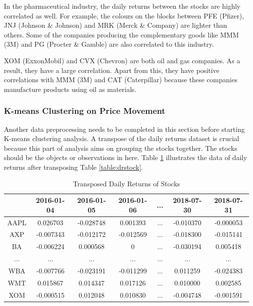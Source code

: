 \documentclass[11pt]{article} %
\theoremstyle{plain}
\theoremstyle{definition}
\begin{document}
In the pharmaceutical industry, the daily returns between the stocks are highly correlated as well. For example, the colours on the blocks between PFE (Pfizer), JNJ (Johnson \& Johnson) and MRK (Merck \& Company) are lighter than others. Some of the companies producing the complementary goods like MMM (3M) and PG (Procter \& Gamble) are also correlated to this industry.

XOM (ExxonMobil) and CVX (Chevron) are both oil and gas companies. As a result, they have a large correlation. Apart from this, they have positive correlations with MMM (3M) and CAT (Caterpillar) because these companies manufacture products using oil as materials.

\subsubsection{K-means Clustering on Price Movement}

Another data preprocessing needs to be completed in this section before starting K-means clustering analysis. A transpose of the daily returns dataset is crucial because this part of analysis aims on grouping the stocks together. The stocks should be the objects or observations in here. Table \ref{table:tpstock} illustrates the data of daily returns after transposing Table \ref{table:drstock}.

{
  \begin{table}[ht]
    \centering
    \scriptsize
    \begin{tabular}{|c|c c c c c c|}
      \hline
       & 2016-01-04 & 2016-01-05 & 2016-01-06 & ... & 2018-07-30 & 2018-07-31 \\ [0.5ex]
      \hline
      AAPL & 0.026703 & -0.028748 & 0.001393 & ... & -0.010370 & -0.000053 \\
      \hline
      AXP & -0.007343 & -0.012172 & -0.012569 & ... & -0.018300 & -0.015141 \\
      \hline
      BA & -0.006224 & 0.000568 & 0 & ... & -0.030194 & 0.005418 \\
      \hline
      ... & ... & ... & ... & ... & ... & ... \\
      \hline
      WBA & -0.007766 & -0.023191 & -0.011299 & ... & 0.011259 & -0.024383 \\
      \hline
      WMT & 0.015867 & 0.014347 & 0.017126 & ... & 0.010000 & 0.002585 \\
      \hline
      XOM & -0.000515 & 0.012048 & 0.010830 & ... & -0.004748 & -0.001591 \\
      \hline
    \end{tabular}
    \caption{Transposed Daily Returns of Stocks}
    \label{table:tpstock}
  \end{table}
}
\end{document}
